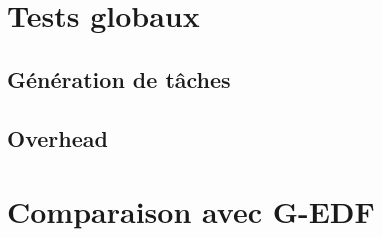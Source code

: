 \section{Tests globaux}

\subsection{Génération de tâches}

\subsection{Overhead}

\section{Comparaison avec G-EDF}
